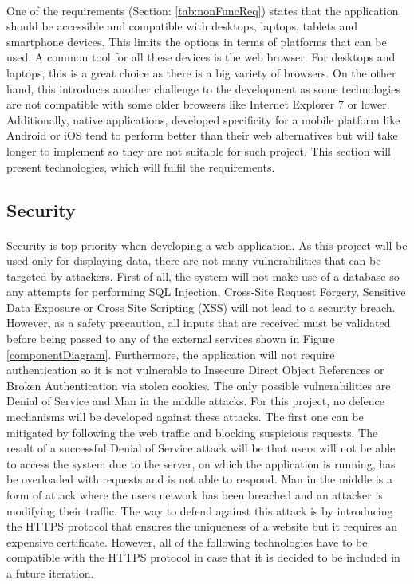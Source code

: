 \documentclass{l4proj}
\begin{document}
\paragraph{}
One of the requirements (Section: \ref{tab:nonFuncReq}) states that the application should be accessible and compatible with desktops, laptops, tablets and smartphone devices. This limits the options in terms of platforms that can be used. A common tool for all these devices is the web browser. For desktops and laptops, this is a great choice as there is a big variety of browsers. On the other hand, this introduces another challenge to the development as some technologies are not compatible with some older browsers like Internet Explorer 7 or lower. Additionally, native applications, developed specificity for a mobile platform like Android or iOS tend to perform better than their web alternatives but will take longer to implement so they are not suitable for such project. This section will present technologies, which will fulfil the requirements.

\subsection{Security}
\paragraph{}
Security is top priority when developing a web application. As this project will be used only for displaying data, there are not many vulnerabilities that can be targeted by attackers. First of all, the system will not make use of a database so any attempts for performing SQL Injection, Cross-Site Request Forgery, Sensitive Data Exposure or Cross Site Scripting (XSS) will not lead to a security breach. However, as a safety precaution, all inputs that are received must be validated before being passed to any of the external services shown in Figure \ref{componentDiagram}. Furthermore, the application will not require authentication so it is not vulnerable to Insecure Direct Object References or Broken Authentication via stolen cookies. The only possible vulnerabilities are Denial of Service and Man in the middle attacks. For this project, no defence mechanisms will be developed against these attacks. The first one can be mitigated by following the web traffic and blocking suspicious requests. The result of a successful Denial of Service attack will be that users will not be able to access the system due to the server, on which the application is running, has be overloaded with requests and is not able to respond. Man in the middle is a form of attack where the user\textquotesingle s network has been breached and an attacker is modifying their traffic. The way to defend against this attack is by introducing the HTTPS protocol that ensures the uniqueness of a website but it requires an expensive certificate. However, all of the following technologies have to be compatible with the HTTPS protocol in case that it is decided to be included in a future iteration.   
\end{document}
